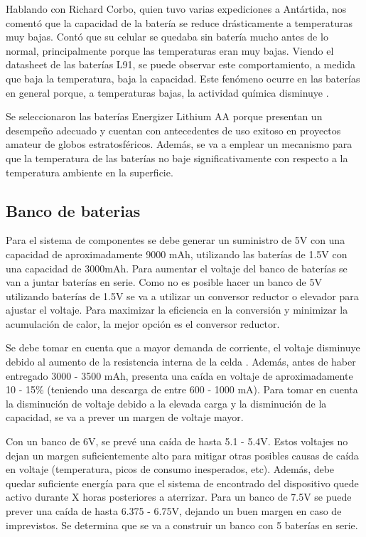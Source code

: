 \documentclass[12pt,a4paper]{article}
\begin{document}
Hablando con Richard Corbo, quien tuvo varias expediciones a Antártida, nos comentó que la capacidad de la batería se reduce drásticamente a temperaturas muy bajas. Contó que su celular se quedaba sin batería mucho antes de lo normal, principalmente porque las temperaturas eran muy bajas. Viendo el datasheet de las baterías L91, se puede observar este comportamiento, a medida que baja la temperatura, baja la capacidad. Este fenómeno ocurre en las baterías en general porque, a temperaturas bajas, la actividad química disminuye \cite{ref104}.

Se seleccionaron las baterías Energizer Lithium AA porque presentan un desempeño adecuado y cuentan con antecedentes de uso exitoso en proyectos amateur de globos estratosféricos. Además, se va a emplear un mecanismo para que la temperatura de las baterías no baje significativamente con respecto a la temperatura ambiente en la superficie.

\subsection{Banco de baterias}\label{banco-de-baterias}

Para el sistema de componentes se debe generar un suministro de 5V con una capacidad de aproximadamente 9000 mAh, utilizando las baterías de 1.5V con una capacidad de 3000mAh. Para aumentar el voltaje del banco de baterías se van a juntar baterías en serie. Como no es posible hacer un banco de 5V utilizando baterías de 1.5V se va a utilizar un conversor reductor o elevador para ajustar el voltaje. Para maximizar la eficiencia en la conversión y minimizar la acumulación de calor, la mejor opción es el conversor reductor.

Se debe tomar en cuenta que a mayor demanda de corriente, el voltaje disminuye debido al aumento de la resistencia interna de la celda \cite{ref105}. Además, antes de haber entregado 3000 - 3500 mAh, presenta una caída en voltaje de aproximadamente 10 - 15\% (teniendo una descarga de entre 600 - 1000 mA). Para tomar en cuenta la disminución de voltaje debido a la elevada carga y la disminución de la capacidad, se va a prever un margen de voltaje mayor.

Con un banco de 6V, se prevé una caída de hasta 5.1 - 5.4V. Estos voltajes no dejan un margen suficientemente alto para mitigar otras posibles causas de caída en voltaje (temperatura, picos de consumo inesperados, etc). Además, debe quedar suficiente energía para que el sistema de encontrado del dispositivo quede activo durante X horas posteriores a aterrizar. Para un banco de 7.5V se puede prever una caída de hasta 6.375 - 6.75V, dejando un buen margen en caso de imprevistos. Se determina que se va a construir un banco con 5 baterías en serie.
\end{document}
